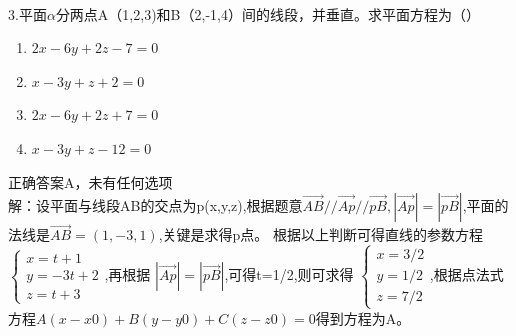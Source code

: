 \documentclass[fleqn]{article}
\begin{document}
\begin{flushleft}
\paragraph{ }
3.平面$\alpha$分两点A（1,2,3)和B（2,-1,4）间的线段，并垂直。求平面方程为（）
\begin{enumerate}
\item $2x-6y+2z-7=0$\\
\item $x-3y+z+2=0$\\
\item $2x-6y+2z+7=0$\\
\item $x-3y+z-12=0$\\
\end{enumerate}
正确答案A，未有任何选项\\
解：设平面与线段AB的交点为p(x,y,z),根据题意$\overrightarrow{AB}//\overrightarrow{Ap}//\overrightarrow{pB},|\overrightarrow{Ap}|=|\overrightarrow{pB}|$,平面的法线是$\overrightarrow{AB}=(1,-3,1)$,关键是求得p点。
根据以上判断可得直线的参数方程$\left\{\begin{array}{ll}
x=t+1\\
y=-3t+2\\
z=t+3
\end{array}
\right.
$,再根据
$|\overrightarrow{Ap}|=|\overrightarrow{pB}|$,可得t=1/2,则可求得
$\left\{ \begin{array}{l}
x=3/2\\
y=1/2\\
z=7/2
\end{array} \right.$,根据点法式方程$A(x-x0)+B(y-y0)+C(z-z0)=0$得到方程为A。

\end{flushleft}
\end{document}
